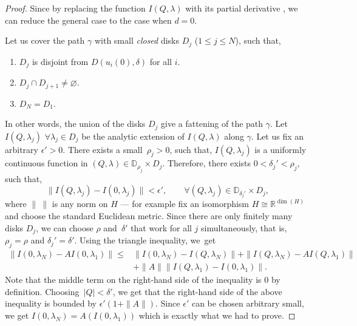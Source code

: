 \documentclass[pdftex]{sigma}
\numberwithin{equation}{section}
\newcommand{\RR}{\mathbb{R}}
\begin{document}
\begin{proof}
Since  by replacing the function $I(Q,\lambda)$ with its partial derivative , we can reduce the general case to the case when $d=0$.

Let us cover the path $\gamma$ with small {\em closed} disks $D_j$ ($1\leq j\leq N$), such that,
\begin{enumerate}\itemsep=0pt
\item[(i)]
$D_j$ is disjoint from $D(u_i(0),\delta)$ for all $i$.
\item[(ii)]
$D_j\cap D_{j+1}\neq \varnothing$.
\item[(iii)]
$D_N=D_1$.
\end{enumerate}
In other words, the union of the disks $D_j$ give a fattening of the
path $\gamma$. Let $I(Q,\lambda_j)$ $\forall \lambda_j\in D_j$ be the
analytic extension of $I(Q,\lambda)$ along $\gamma$. Let us fix an
arbitrary $\epsilon'>0$. There exists a small~${\rho_j>0}$, such that,
$I(Q,\lambda_j)$ is a uniformly continuous function in $(Q,\lambda)\in
\mathbb{D}_{\rho_j}\times D_j$. Therefore, there exists $0<\delta_j'<\rho_j$, such that,
\[
\|I(Q,\lambda_j)-I(0,\lambda_j)\|<\epsilon',\qquad \forall
(Q,\lambda_j)\in \mathbb{D}_{\delta_j'}\times D_j,
\]
where $\|\ \|$ is any norm on $H$ --- for example fix an
isomorphism $H\cong \RR^{\operatorname{dim}(H)}$ and choose the
standard Euclidean metric.
Since there are only finitely many disks $D_j$, we can choose $\rho$
and~$\delta'$ that work for all $j$ simultaneously, that is,
$\rho_j=\rho$ and $\delta_j'=\delta'$. Using the triangle inequality,
we~get
\begin{align*}
\| I(0,\lambda_N)-AI(0,\lambda_1)\| \leq{}&
\| I(0,\lambda_N)-I(Q,\lambda_N)\| +
\| I(Q,\lambda_N)-AI(Q,\lambda_1)\|\\
& +
\|A\| \| I(Q,\lambda_1)-I(0,\lambda_1)\|.
\end{align*}
Note that the middle term on the right-hand side of the inequality is $0$ by definition. Choosing~${|Q|<\delta'}$, we get that the right-hand side of the above inequality is bounded by $\epsilon'(1+\|A\|)$. Since $\epsilon'$ can be chosen arbitrary small, we get $I(0,\lambda_N)=A(I(0,\lambda_1))$ which is exactly what we had to prove.
\end{proof}
\end{document}
